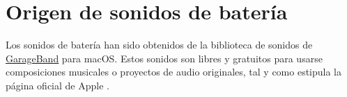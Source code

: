 
    \section{Origen de sonidos de batería} %
    \label{sec:OrigenDeSonidosDeBateria}

        Los sonidos de batería han sido obtenidos de la biblioteca de sonidos de
        \href{https://www.apple.com/es/mac/garageband/}{\underline{GarageBand}} para macOS. Estos sonidos son libres y
        gratuitos para usarse composiciones musicales o proyectos de audio originales, tal y como estipula la página
        oficial de Apple \cite{support_garageband}.


